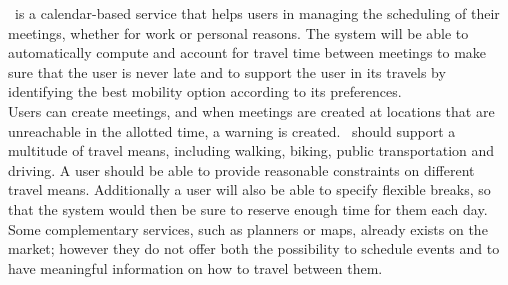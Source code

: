 \projectname~is a calendar-based service that helps users in managing the scheduling of their meetings, whether for work or personal reasons. The system will be able to automatically compute and account for travel time between meetings to make sure that the user is never late and to support the user in its travels by identifying the best mobility option according to its preferences. \\
Users can create meetings, and when meetings are created at locations that are unreachable in the allotted time, a warning is created. \projectname~should support a multitude of travel means, including walking, biking, public transportation and driving. A user should be able to provide reasonable constraints on different travel means. Additionally a user will also be able to specify flexible breaks, so that the system would then be sure to reserve enough time for them each day. \\
Some complementary services, such as planners or maps, already exists on the market; however they do not offer both the possibility to schedule events and to have meaningful information on how to travel between them.